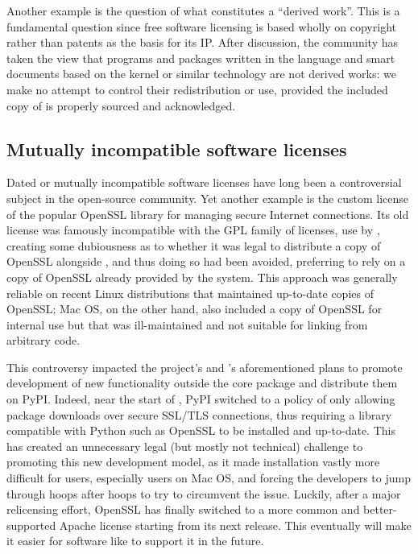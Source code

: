 \documentclass{deliverablereport}
\begin{document}
Another example is the question of what constitutes a ``derived
work''. This is a fundamental question since free software licensing is based
wholly on copyright rather than patents as the basis for its IP. After
discussion, the \GAP community has taken the view that programs and
packages written in the \GAP language and smart documents based on
the \GAP \Jupyter kernel or similar technology are not derived works:
we make no attempt to control
their redistribution or use, provided the included copy of \GAP is
properly sourced and acknowledged.

\subsection{Mutually incompatible software licenses}

Dated or mutually incompatible software licenses have long been a
controversial subject in the open-source community. Yet another example
is the custom license of the popular OpenSSL library for managing secure
Internet connections.  Its old license was famously incompatible with the GPL
family of licenses, use by \Sage, creating some dubiousness as to whether
it was legal to distribute a copy of OpenSSL alongside \Sage, and thus
doing so had been avoided, preferring to rely on a copy of OpenSSL already
provided by the system.  This approach was generally reliable on recent
Linux distributions that maintained up-to-date copies of OpenSSL; Mac OS,
on the other hand, also included a copy of OpenSSL for internal use but that
was ill-maintained and not suitable for linking from arbitrary code.

This controversy impacted the \Sage project's and \ODK's aforementioned plans
to promote development of new functionality outside the core package and
distribute them on PyPI.  Indeed, near the start of \ODK, PyPI
switched to a policy of only allowing package downloads over secure SSL/TLS
connections, thus requiring a library compatible with Python such as OpenSSL to
be installed and up-to-date.  This has created an unnecessary legal (but
mostly not technical) challenge to promoting this new development model,
as it made installation vastly more difficult for users, especially users on
Mac OS, and forcing the developers to jump through hoops after hoops to
try to circumvent the issue.
Luckily, after a major relicensing effort, OpenSSL has finally switched
to a more common and better-supported Apache license starting from its
next release. This eventually will make it easier for software like
\Sage to support it in the future.
\end{document}
